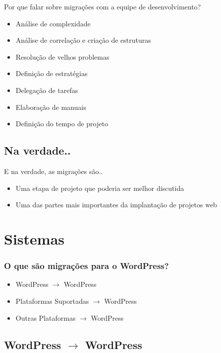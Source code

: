 \documentclass[handout]{beamer}
\begin{document}
\begin{frame}{Por que falar sobre migrações com a equipe de desenvolvimento?}
\begin{itemize}
  \pause \item Análise de complexidade
  \pause \item Análise de correlação e criação de estruturas
  \pause \item Resolução de velhos problemas
  \pause \item Definição de estratégias
  \pause \item Delegação de tarefas
  \pause \item Elaboração de manuais
  \pause \item Definição do tempo de projeto
\end{itemize}
\end{frame}

\subsection{Na verdade..}

\begin{frame}{E na verdade, as migrações são..}
\begin{itemize}
  \pause \item Uma etapa de projeto que poderia ser melhor discutida
  \pause \item Uma das partes mais importantes da implantação de projetos web
\end{itemize}
\end{frame}


\section{Sistemas}

\begin{frame}
\frametitle{O que são migrações para o WordPress?}
\begin{itemize}
  \pause \item WordPress $\rightarrow$ WordPress
  \pause \item Plataformas Suportadas $\rightarrow$ WordPress
  \pause \item Outras Plataformas $\rightarrow$ WordPress
\end{itemize}
\end{frame}

\subsection{WordPress $\rightarrow$ WordPress}
\end{document}
